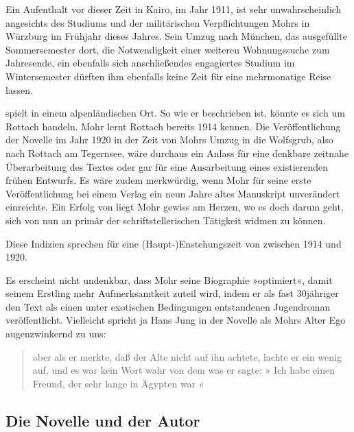 \begin{small}
Ein Aufenthalt vor dieser Zeit in Kairo, im Jahr 1911, ist sehr
unwahrscheinlich angesichts des Studiums und der militärischen
Verpflichtungen Mohrs in Würzburg im Frühjahr dieses Jahres. Sein Umzug nach München,
das ausgefüllte Sommersemester dort, die Notwendigkeit einer weiteren Wohnungssuche zum Jahresende,
ein ebenfalls sich anschließendes engagiertes Studium im Wintersemester
dürften ihm ebenfalls keine Zeit für eine mehrmonatige Reise lassen.%

\textit{\buchtitel{}} spielt in einem alpenländischen Ort. So wie
er beschrieben ist, könnte es sich um Rottach handeln. Mohr lernt
Rottach bereits 1914 kennen.
Die Veröffentlichung der Novelle im Jahr 1920 in der Zeit von
Mohrs Umzug in die Wolfsgrub, also nach Rottach am Tegernsee,
wäre durchaus ein Anlass für eine denkbare zeitnahe Überarbeitung
des Textes oder gar für eine Ausarbeitung eines existierenden
frühen Entwurfs. Es wäre zudem merkwürdig,
wenn Mohr für seine erste Veröffentlichung bei einem Verlag ein
neun Jahre altes Manuskript unverändert einreichte. Ein Erfolg
von \textit{\buchtitel{}} liegt Mohr gewiss am Herzen, wo es doch
darum geht, sich von nun an primär der schriftstellerischen
Tätigkeit widmen zu können.

Diese Indizien sprechen für eine (Haupt-)Enstehungszeit
von \textit{\buchtitel{}} zwischen 1914 und 1920.

Es erscheint nicht undenkbar, dass Mohr seine Biographie »optimiert«,%
damit seinem Erstling mehr Aufmerksamtkeit zuteil wird,
indem er als fast 30jähriger den Text als einen unter exotischen Bedingungen entstandenen
Jugendroman veröffentlicht. Vielleicht spricht ja Hans Jung in der
Novelle als Mohrs Alter Ego augenzwinkernd zu uns:

\begin{quote}
 aber
als er merkte, daß der Alte nicht auf ihn achtete,
lachte er ein wenig auf, und es war kein Wort wahr
von dem was er sagte: » Ich
habe einen Freund, der sehr lange in Ägypten war «%
\end{quote}

\subsection{Die Novelle und der Autor}


\end{small}
